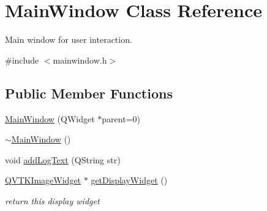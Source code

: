 \hypertarget{class_main_window}{\section{Main\-Window Class Reference}
\label{d9/dc6/class_main_window}
}


Main window for user interaction.  




{\ttfamily \#include $<$mainwindow.\-h$>$}

\subsection*{Public Member Functions}
\begin{DoxyCompactItemize}
\item 
\hyperlink{class_main_window_a8b244be8b7b7db1b08de2a2acb9409db}{Main\-Window} (Q\-Widget $\ast$parent=0)
\item 
\hyperlink{class_main_window_ae98d00a93bc118200eeef9f9bba1dba7}{$\sim$\-Main\-Window} ()
\item 
void \hyperlink{class_main_window_a02dc93b38c4cf808db9d26e59521ec0b}{add\-Log\-Text} (Q\-String str)
\item 
\hyperlink{class_q_v_t_k_image_widget}{Q\-V\-T\-K\-Image\-Widget} $\ast$ \hyperlink{class_main_window_ab31ca15852fe0ccb8d7571251b9940a0}{get\-Display\-Widget} ()
\begin{DoxyCompactList}\small\item\em return this display widget \end{DoxyCompactList}\end{DoxyCompactItemize}
